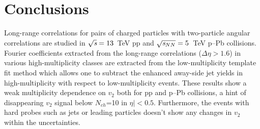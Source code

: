 
\section{Conclusions}
\label{sec:summary}
Long-range correlations for pairs of charged particles with two-particle angular correlations are studied in ${\sqrt{{\textit s}}}=13$~TeV pp and ${\sqrt{{\textit s_{NN}}}}=5$~TeV p--Pb collisions. Fourier coefficients extracted from the long-range correlations ($\Delta\eta > 1.6$) in various high-multiplicity classes are extracted from the low-multiplicity template fit method which allows one to subtract the enhanced away-side jet yields in high-multiplicity with respect to low-multiplicity events.
These results show a weak multiplicity dependence on $v_2$ both for pp and p--Pb collisions, a hint of disappearing $v_2$ signal below $N_{ch}$=10 in $\eta|<0.5$. Furthermore, the events with hard probes such as jets or leading particles doesn't show any changes in $v_2$ within the uncertainties.